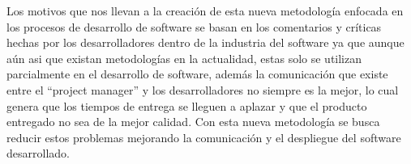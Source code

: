 Los motivos que nos llevan a la creación de esta nueva metodología enfocada en los
procesos de desarrollo de software se basan en los comentarios y críticas hechas por los
desarrolladores dentro de la industria del software ya que aunque aún asi que existan
metodologías en la actualidad, estas solo se utilizan parcialmente en el desarrollo de
software, además la comunicación que existe entre el “project manager” y los
desarrolladores no siempre es la mejor, lo cual genera que los tiempos de entrega se
lleguen a aplazar y que el producto entregado no sea de la mejor calidad. Con esta nueva
metodología se busca reducir estos problemas mejorando la comunicación y el despliegue
del software desarrollado.
